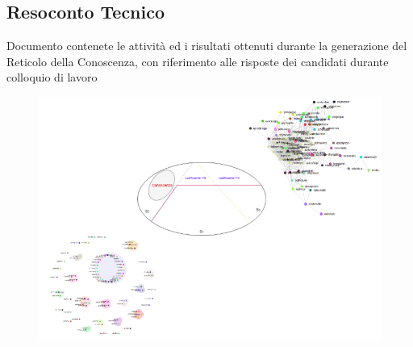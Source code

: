 \begin{center}\section*{Resoconto Tecnico}\end{center}
\begin{center}Documento contenete le attività ed i risultati ottenuti durante la generazione del Reticolo della Conoscenza, con riferimento alle risposte dei candidati durante colloquio di lavoro\end{center}
\vspace{2cm}
\begin{figure}[H]
\centering
	\includegraphics[width=1\linewidth]{./image/logo_Reticolo-della-Conoscenza.png}
\end{figure}